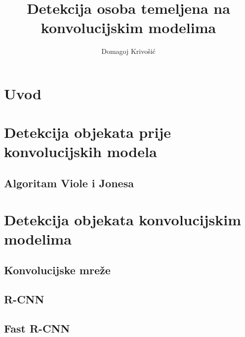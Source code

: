 \documentclass[times, utf8, diplomski]{fer}
\begin{document}

\title{Detekcija osoba temeljena na konvolucijskim modelima}

\author{Domagoj Krivošić}

\maketitle

\izvornik


\tableofcontents

\chapter{Uvod}


\chapter{Detekcija objekata prije konvolucijskih modela}


\section{Algoritam Viole i Jonesa}


\chapter{Detekcija objekata konvolucijskim modelima}


\section{Konvolucijske mreže}



\section{R-CNN}


\section{Fast R-CNN}

\end{document}
